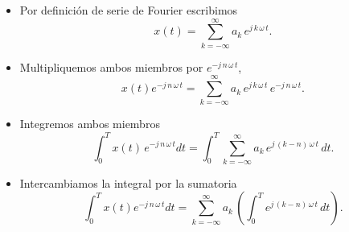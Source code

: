 \begin{itemize}

        \item   Por definici\'{o}n de serie de Fourier escribimos
        \begin{equation}
                x\left( t\right) =\sum_{k=-\infty }^{\infty
                }a_{k} \, e^{j \, k \, \omega \, t}. \label{sinfs}
        \end{equation}

        \item   Multipliquemos ambos miembros por $e^{-j \, n \, \omega \, t}$,
        \begin{equation}
            x\left( t\right) e^{-j \, n \, \omega \, t}=
            \sum_{k=-\infty }^{\infty } a_{k} \, e^{j \, k \, \omega \, t} \, e^{-j \, n \, \omega \, t}.
        \end{equation}

        \item   Integremos ambos miembros
        \begin{equation}
            \int_{0}^{T}x\left( t\right) \, e^{-j \, n \, \omega \, t}dt=
            \int_{0}^{T}\sum_{k=-\infty }^{\infty }a_{k} \, e^{j \, \left( k-n\right) \, \omega \, t} \, dt.
        \end{equation}
        
        \item   Intercambiamos la integral por la sumatoria
        \begin{equation}
           \int_{0}^{T}x\left( t\right) e^{-j \, n \, \omega \, t}dt=
           \sum_{k=-\infty }^{\infty}a_{k} \, 
               \left( \int_{0}^{T}e^{j \, \left( k-n\right) \, \omega \, t} \, dt\right).
        \end{equation}


\end{itemize}
